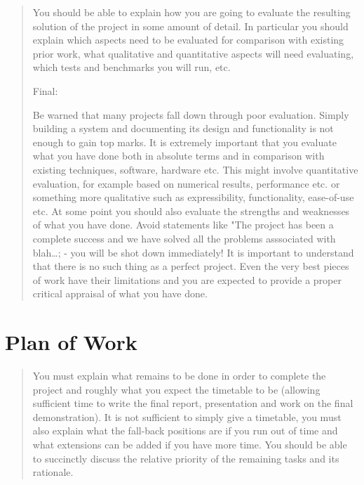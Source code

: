 \documentclass{report}
\begin{document}
\begin{quote}
You should be able to explain how you are going to evaluate the
resulting solution of the project in some amount of detail. In
particular you should explain which aspects need to be evaluated
for comparison with existing prior work, what qualitative and
quantitative aspects will need evaluating, which tests and
benchmarks you will run, etc.

Final:

Be warned that many projects fall down through poor evaluation.
Simply building a system and documenting its design and
functionality is not enough to gain top marks. It is extremely
important that you evaluate what you have done both in absolute
terms and in comparison with existing techniques, software,
hardware etc. This might involve quantitative evaluation, for
example based on numerical results, performance etc. or something
more qualitative such as expressibility, functionality, ease-of-use
etc. At some point you should also evaluate the strengths and
weaknesses of what you have done. Avoid statements like "The
project has been a complete success and we have solved all the
problems asssociated with blah\ldots{}; - you will be shot down
immediately! It is important to understand that there is no such
thing as a perfect project. Even the very best pieces of work have
their limitations and you are expected to provide a proper critical
appraisal of what you have done.

\end{quote}
\section{Plan of Work}

\begin{quote}
You must explain what remains to be done in order to complete the
project and roughly what you expect the timetable to be (allowing
sufficient time to write the final report, presentation and work on
the final demonstration). It is not sufficient to simply give a
timetable, you must also explain what the fall-back positions are
if you run out of time and what extensions can be added if you have
more time. You should be able to succinctly discuss the relative
priority of the remaining tasks and its rationale.

\end{quote}



\end{document}
